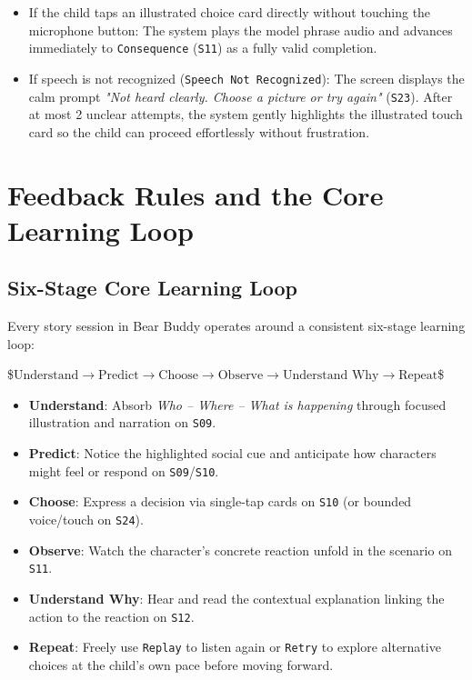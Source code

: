 \begin{itemize}
  \item If the child taps an illustrated choice card directly without touching the microphone button: The system plays the model phrase audio and advances immediately to \texttt{Consequence} (\texttt{S11}) as a fully valid completion.
  \item If speech is not recognized (\texttt{Speech Not Recognized}): The screen displays the calm prompt \textit{"Not heard clearly. Choose a picture or try again"} (\texttt{S23}). After at most 2 unclear attempts, the system gently highlights the illustrated touch card so the child can proceed effortlessly without frustration.
\end{itemize}



\section{Feedback Rules and the Core Learning Loop}



\subsection{Six-Stage Core Learning Loop}


Every story session in Bear Buddy operates around a consistent six-stage learning loop:

\$$\text{Understand} \longrightarrow \text{Predict} \longrightarrow \text{Choose} \longrightarrow \text{Observe} \longrightarrow \text{Understand Why} \longrightarrow \text{Repeat}$\$

\begin{itemize}
  \item \textbf{Understand}: Absorb \textit{Who – Where – What is happening} through focused illustration and narration on \texttt{S09}.
  \item \textbf{Predict}: Notice the highlighted social cue and anticipate how characters might feel or respond on \texttt{S09}/\texttt{S10}.
  \item \textbf{Choose}: Express a decision via single-tap cards on \texttt{S10} (or bounded voice/touch on \texttt{S24}).
  \item \textbf{Observe}: Watch the character's concrete reaction unfold in the scenario on \texttt{S11}.
  \item \textbf{Understand Why}: Hear and read the contextual explanation linking the action to the reaction on \texttt{S12}.
  \item \textbf{Repeat}: Freely use \texttt{Replay} to listen again or \texttt{Retry} to explore alternative choices at the child's own pace before moving forward.
\end{itemize}



